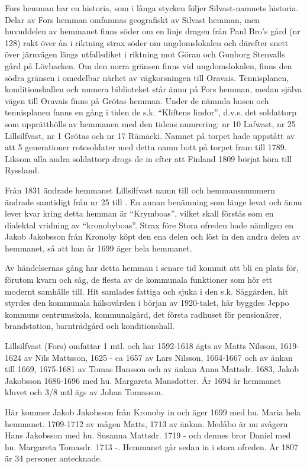 Fors hemman har en historia, som i långa stycken följer Silvast-namnets historia. Delar av Fors hemman omfamnas geografiskt av Silvast hemman, men huvuddelen av hemmanet finns söder om en linje dragen från Paul Bro's gård (nr 128) rakt över ån i riktning strax söder om ungdomslokalen och därefter snett över järnvägen längs utfallsdiket i riktning mot Göran och Gunborg Stenvalls gård på Lövbacken. Om den norra gränsen finns vid ungdomslokalen, finns den södra gränsen i omedelbar närhet av vägkorsningen till Oravais. Tennisplanen, konditionshallen och numera biblioteket står ännu på Fors hemman, medan själva vägen till Oravais finns på Grötas hemman. Under de nämnda husen och tennisplanen fanns en gång i tiden de s.k. ``Kliftens lindor'', d.v.s. det soldattorp som upprätthölls av hemmanen med den tidens numrering: nr 10 Lafwast, nr 25 Lillsilfvast, nr 1 Grötas och nr 17 Rämäcki. Namnet på torpet hade uppstått av att 5 generationer rotesoldater med detta namn bott på torpet fram till 1789. Liksom alla andra soldattorp drogs de in efter att Finland 1809 börjat höra till Ryssland.

Från 1831 ändrade hemmanet Lillsilfvast namn till  och hemmansnummern ändrade samtidigt från nr 25  till . En annan benämning som länge levat och ännu lever kvar kring detta hemman är ``Krymboas'', vilket skall förstås som en dialektal vridning  av ``kronobyboas''. Strax före Stora ofreden hade nämligen en Jakob Jakobsson från Kronoby köpt den ena delen och löst in den andra delen av hemmanet, så att han år 1699 äger hela hemmanet.

Av händelsernas gång har detta hemman i senare tid kommit att bli en plats för, förutom kvarn och såg, de flesta av de kommunala funktioner som hör ett modernt samhälle till. Hit samlades fattiga och sjuka i den s.k. Såggården, hit styrdes den kommunala hälsovården i början av 1920-talet, här byggdes Jeppo kommuns centrumskola, kommunalgård, det första radhuset för pensionärer, brandstation, barnträdgård och konditionshall.

Lillsilfvast (Fors) omfattar 1 mtl. och har 1592-1618 ägts av Matts Nilsson, 1619-1624 av Nils Mattsson, 1625 - ca 1657 av Lars Nilsson, 1664-1667 och av änkan till 1669, 1675-1681 av Tomas Hansson och av änkan Anna Mattsdr. 1683, Jakob Jakobsson 1686-1696 med hu. Margareta Mansdotter. År 1694 är hemmanet kluvet och 3/8 mtl ägs av Johan Tomasson.

Här kommer Jakob Jakobsson från Kronoby in och äger 1699 med hu. Maria hela hemmanet. 1709-1712 av mågen Matts, 1713 av änkan. Medåbo är nu svågern Hans Jakobsson med hu. Susanna Mattsdr. 1719 -  och dennes bror Daniel med hu. Margareta Tomasdr. 1713  -. Hemmanet går sedan in i stora ofreden. År 1807 är 34 personer antecknade.

